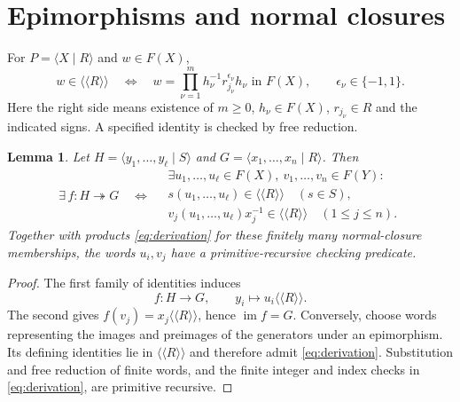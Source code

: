 \documentclass[12pt]{article}
\numberwithin{equation}{section}
\newtheorem{lemma}[theorem]{Lemma}
\theoremstyle{definition}
\theoremstyle{remark}
\newcommand{\nc}[1]{\langle\!\langle #1\rangle\!\rangle}
\newcommand{\gp}[1]{\langle #1\rangle}
\newcommand{\im}{\operatorname{im}}
\newcommand{\epito}{\twoheadrightarrow}
\begin{document}
\section{Epimorphisms and normal closures}
\label{sec:certificates}

For $P=\gp{X\mid R}$ and $w\in F(X)$,
\begin{equation}
\label{eq:derivation}
 w\in\nc{R}
 \quad\Longleftrightarrow\quad
 w=\prod_{\nu=1}^{m}h_\nu^{-1}r_{j_\nu}^{\epsilon_\nu}h_\nu
 \text{ in }F(X),
 \qquad \epsilon_\nu\in\{-1,1\}.
\end{equation}
Here the right side means existence of $m\ge0$, $h_\nu\in F(X)$,
$r_{j_\nu}\in R$ and the indicated signs. A specified identity is
checked by free reduction.

\begin{lemma}
\label{lem:epi}
Let $H=\gp{y_1,\ldots,y_\ell\mid S}$ and
$G=\gp{x_1,\ldots,x_n\mid R}$. Then
\[
 \exists\,f:H\epito G
 \quad\Longleftrightarrow\quad
 \begin{gathered}
 \exists u_1,\ldots,u_\ell\in F(X),\
         v_1,\ldots,v_n\in F(Y):\\
 s(u_1,\ldots,u_\ell)\in\nc{R}\quad(s\in S),\\
 v_j(u_1,\ldots,u_\ell)x_j^{-1}\in\nc{R}\quad(1\le j\le n).
 \end{gathered}
\]
Together with products \eqref{eq:derivation} for these finitely many
normal-closure memberships, the words $u_i,v_j$ have a
primitive-recursive checking predicate.
\end{lemma}

\begin{proof}
The first family of identities induces
\[
 f:H\longrightarrow G,\qquad y_i\longmapsto u_i\nc{R}.
\]
The second gives $f(v_j)=x_j\nc{R}$, hence $\im f=G$.
Conversely, choose words representing the images and preimages of
the generators under an epimorphism. Its defining identities lie
in $\nc{R}$ and therefore admit \eqref{eq:derivation}.
Substitution and free reduction of finite words, and the finite
integer and index checks in \eqref{eq:derivation}, are primitive recursive.
\end{proof}
\end{document}

